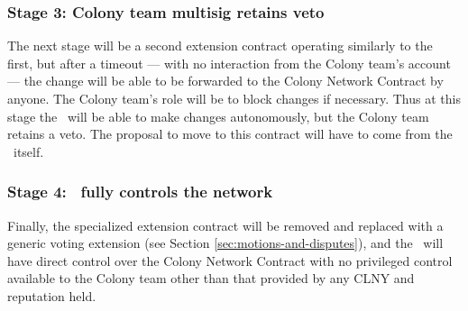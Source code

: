 \subsubsection*{Stage 3: Colony team multisig retains veto}
The next stage will be a second extension contract operating similarly to the first, but after a timeout --- with no interaction from the Colony team's account --- the change will be able to be forwarded to the Colony Network Contract by anyone. The Colony team's role will be to block changes if necessary. Thus at this stage the \rc\ will be able to make changes autonomously, but the Colony team retains a veto.  The proposal to move to this contract will have to come from the \rc\ itself.

\subsubsection*{Stage 4: \rc\ fully controls the network}
Finally, the specialized extension contract will be removed and replaced with a generic voting extension (see Section \ref{sec:motions-and-disputes}), and the \rc\ will have direct control over the Colony Network Contract with no privileged control available to the Colony team other than that provided by any CLNY and reputation held.
